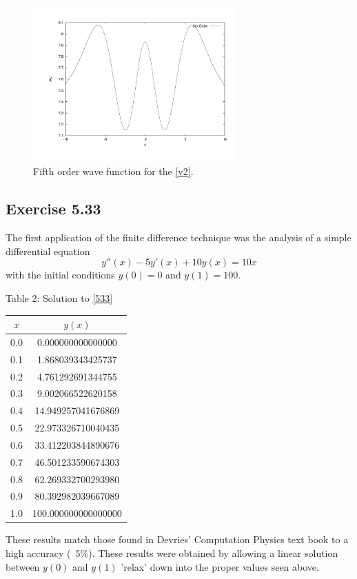 \documentclass[12pt]{article}
\begin{document}
\begin{figure}[!h]
\centering
\includegraphics[width =110 mm, height = 60mm]{quantum_abs_5.pdf}
\caption{Fifth order wave function for the \eqref{v2}.}
\label{fig:quant5}
\end{figure}
\pagebreak
\subsection{Exercise 5.33}
The first application of the finite difference technique was the analysis of a simple differential equation
\begin{equation}
\label{533}
y''(x)-5y'(x)+10y(x)=10x
\end{equation}
with the initial conditions $y(0)=0$ and $y(1)=100$.
\begin{center}
Table 2:  Solution to \eqref{533} \\
\begin{tabular}{ | c | c |}
\hline
$x$ & $y(x)$ \\ \hline
0.0&	0.000000000000000 \\ \hline
0.1&	1.868039343425737 \\ \hline
0.2&	4.761292691344755 \\ \hline
0.3&	9.002066522620158 \\ \hline
0.4&	14.949257041676869 \\ \hline
0.5&	22.973326710040435 \\ \hline
0.6&	33.412203844890676 \\ \hline
0.7&	46.501233590674303 \\ \hline
0.8&	62.269332700293980 \\ \hline
0.9&	80.392982039667089 \\ \hline
1.0&	100.000000000000000 \\ \hline
\end{tabular}
\end{center}
These results match those found in Devries' Computation Physics text book to a high accuracy (~5\%).  These results were obtained by allowing a linear solution between $y(0)$ and $y(1)$ 'relax' down into the proper values seen above.
\end{document}
